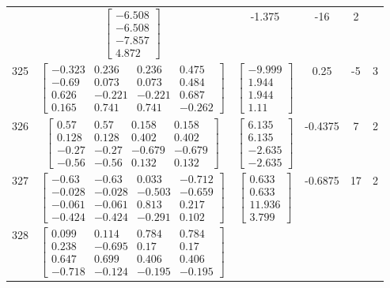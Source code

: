 \documentclass[a4paper,12pt]{article}
\begin{document}
\begin{tabular}{c c c c c c}
&
$\begin{bmatrix} -6.508 \\ -6.508 \\ -7.857 \\ 4.872 \end{bmatrix}$
&
-1.375
&
-16
&
2
\\
325
&
$\begin{bmatrix} -0.323 & 0.236 & 0.236 & 0.475 \\ -0.69 & 0.073 & 0.073 & 0.484 \\ 0.626 & -0.221 & -0.221 & 0.687 \\ 0.165 & 0.741 & 0.741 & -0.262 \end{bmatrix}$
&
$\begin{bmatrix} -9.999 \\ 1.944 \\ 1.944 \\ 1.11 \end{bmatrix}$
&
0.25
&
-5
&
3
\\
326
&
$\begin{bmatrix} 0.57 & 0.57 & 0.158 & 0.158 \\ 0.128 & 0.128 & 0.402 & 0.402 \\ -0.27 & -0.27 & -0.679 & -0.679 \\ -0.56 & -0.56 & 0.132 & 0.132 \end{bmatrix}$
&
$\begin{bmatrix} 6.135 \\ 6.135 \\ -2.635 \\ -2.635 \end{bmatrix}$
&
-0.4375
&
7
&
2
\\
327
&
$\begin{bmatrix} -0.63 & -0.63 & 0.033 & -0.712 \\ -0.028 & -0.028 & -0.503 & -0.659 \\ -0.061 & -0.061 & 0.813 & 0.217 \\ -0.424 & -0.424 & -0.291 & 0.102 \end{bmatrix}$
&
$\begin{bmatrix} 0.633 \\ 0.633 \\ 11.936 \\ 3.799 \end{bmatrix}$
&
-0.6875
&
17
&
2
\\
328
&
$\begin{bmatrix} 0.099 & 0.114 & 0.784 & 0.784 \\ 0.238 & -0.695 & 0.17 & 0.17 \\ 0.647 & 0.699 & 0.406 & 0.406 \\ -0.718 & -0.124 & -0.195 & -0.195 \end{bmatrix}$

\end{tabular}
\end{document}
